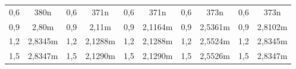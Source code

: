 \begin{center}
\begin{tabular}{cccccccccc}
\multicolumn{1}{|c|}{0,6}                                    & \multicolumn{1}{c|}{380n}                                   & \multicolumn{1}{c|}{0,6}                                    & \multicolumn{1}{c|}{371n}                                   & \multicolumn{1}{c|}{0,6}                                    & \multicolumn{1}{c|}{371n}                                   & \multicolumn{1}{c|}{0,6}                                    & \multicolumn{1}{c|}{373n}                                   & \multicolumn{1}{c|}{0,6}                                    & \multicolumn{1}{c|}{373n}                                   \\
\multicolumn{1}{|c|}{0,9}                                    & \multicolumn{1}{c|}{2,80m}                                  & \multicolumn{1}{c|}{0,9}                                    & \multicolumn{1}{c|}{2,11m}                                  & \multicolumn{1}{c|}{0,9}                                    & \multicolumn{1}{c|}{2,1164m}                                & \multicolumn{1}{c|}{0,9}                                    & \multicolumn{1}{c|}{2,5361m}                                & \multicolumn{1}{c|}{0,9}                                    & \multicolumn{1}{c|}{2,8102m}                                \\
\multicolumn{1}{|c|}{1,2}                                    & \multicolumn{1}{c|}{2,8345m}                                & \multicolumn{1}{c|}{1,2}                                    & \multicolumn{1}{c|}{2,1288m}                                & \multicolumn{1}{c|}{1,2}                                    & \multicolumn{1}{c|}{2,1288m}                                & \multicolumn{1}{c|}{1,2}                                    & \multicolumn{1}{c|}{2,5524m}                                & \multicolumn{1}{c|}{1,2}                                    & \multicolumn{1}{c|}{2,8345m}                                \\
\multicolumn{1}{|c|}{1,5}                                    & \multicolumn{1}{c|}{2,8347m}                                & \multicolumn{1}{c|}{1,5}                                    & \multicolumn{1}{c|}{2,1290m}                                & \multicolumn{1}{c|}{1,5}                                    & \multicolumn{1}{c|}{2,1290m}                                & \multicolumn{1}{c|}{1,5}                                    & \multicolumn{1}{c|}{2,5526m}                                & \multicolumn{1}{c|}{1,5}                                    & \multicolumn{1}{c|}{2,8347m}                                \\

\end{tabular}
\end{center}
